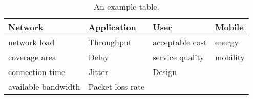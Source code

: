 \begin{table}[h!]
\begin{center}
	\begin{tabulary}{\textwidth}{|L|L|L|L|}
	\textbf{Network}    & \textbf{Application} & \textbf{User}   & \textbf{Mobile}   \\\hline
	network load        & Throughput           & acceptable cost & energy     \\
	coverage area       & Delay                & service quality & mobility          \\
	connection time     & Jitter               & Design          & \\
	available bandwidth & Packet loss rate     &                 & \\\hline
	\end{tabulary}
	\caption{\label{tab:Table} An example table.}
\end{center}
\end{table}



